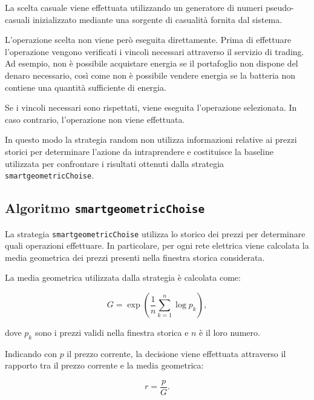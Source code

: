 \documentclass[a4paper,oneside,italian]{sapthesis}
\begin{document}
La scelta casuale viene effettuata utilizzando un generatore di numeri
pseudo-casuali inizializzato mediante una sorgente di casualità fornita
dal sistema.

L'operazione scelta non viene però eseguita direttamente. Prima di effettuare
l'operazione vengono verificati i vincoli necessari attraverso il servizio
di trading. Ad esempio, non è possibile acquistare energia se il portafoglio
non dispone del denaro necessario, così come non è possibile vendere energia
se la batteria non contiene una quantità sufficiente di energia.

Se i vincoli necessari sono rispettati, viene eseguita l'operazione
selezionata. In caso contrario, l'operazione non viene effettuata.

In questo modo la strategia random non utilizza informazioni relative ai
prezzi storici per determinare l'azione da intraprendere e costituisce la
baseline utilizzata per confrontare i risultati ottenuti dalla strategia
\texttt{smartgeometricChoise}.



\subsection{Algoritmo \texttt{smartgeometricChoise}}

La strategia \texttt{smartgeometricChoise} utilizza lo storico dei prezzi
per determinare quali operazioni effettuare. In particolare, per ogni rete
elettrica viene calcolata la media geometrica dei prezzi presenti nella
finestra storica considerata.

La media geometrica utilizzata dalla strategia è calcolata come:

\begin{equation}
    G =
    \exp\left(
        \frac{1}{n}
        \sum_{k=1}^{n}
        \log p_k
    \right),
\end{equation}

dove $p_k$ sono i prezzi validi nella finestra storica e $n$ è il loro numero.

Indicando con $p$ il prezzo corrente, la decisione viene effettuata
attraverso il rapporto tra il prezzo corrente e la media geometrica:

\begin{equation}
    r = \frac{p}{G}.
\end{equation}
\end{document}
